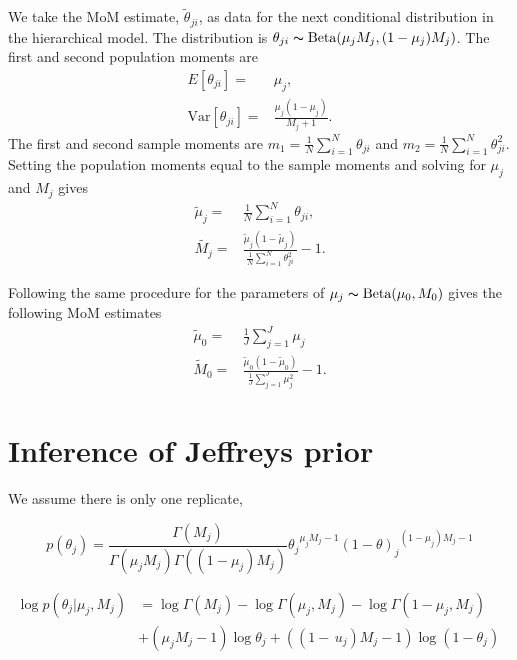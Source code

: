 \documentclass[11pt,reqno]{amsart}
\begin{document}
We take the MoM estimate, $\tilde{\theta}_{ji}$, as data for the next conditional distribution in the hierarchical model. The distribution is $\theta_{ji} \thicksim \text{Beta}(\mu_jM_j, (1-\mu_j)M_j)$. The first and second population moments are
\begin{eqnarray}
	E[\theta_{ji}] =& \mu_j,\\
	\text{Var}[\theta_{ji}] =& \frac{\mu_j(1-\mu_j)} { M_j + 1 }.
\end{eqnarray}
The first and second sample moments are $m_1 = \frac{1}{N}\sum_{i=1}^N \theta_{ji}$ and $m_2 = \frac{1}{N}\sum_{i=1}^N \theta_{ji}^2$. Setting the population moments equal to the sample moments and solving for $\mu_j$ and $M_j$ gives
\begin{eqnarray}
	\tilde{\mu}_j =& \frac{1}{N} \sum_{i=1}^N \theta_{ji}, \\
	\tilde{M_j} =& \frac{ \tilde{\mu}_j (1 - \tilde{\mu}_j ) } { \frac{1}{N} \sum_{i=1}^N \theta_{ji}^2 } -1.
\end{eqnarray}

Following the same procedure for the parameters of $\mu_j \thicksim \text{Beta}(\mu_0, M_0)$ gives the following MoM estimates
\begin{eqnarray}
	\tilde{\mu}_0 =& \frac{1}{J} \sum_{j=1}^J \mu_j \\
	\tilde{M}_0 =& \frac{ \tilde{\mu}_0 (1 - \tilde{\mu}_0 ) } {\frac{1}{J} \sum_{j=1}^J \mu_j^2 } -1.
\end{eqnarray}

\section{Inference of Jeffreys prior}\label{sec:appendix_mom}
We assume there is only one replicate,

\begin{equation}\label{eqn:Betapdf}
p\left({\theta }_{j} \right)= \frac{\Gamma \left({M}_{j} \right)}{\Gamma \left({\mu }_{j} {M}_{j}\right)\Gamma \left(( 1-{\mu }_{j}){M}_{j}\right)} {{\theta}_{j}}^{{\mu}_{j}{M}_{j}-1}{\left(1-\theta\right)_{j}}^{\left(1-{\mu}_{j}\right){M}_{j}-1}
\end{equation}

\begin{equation}\label{equ:JefferyInference1}
\begin{split}
\log p\left(\theta_{j}|\mu_{j},M_{j}\right)& =\log \Gamma \left(M_{j}\right)-\log \Gamma\left(\mu_{j},M_{j}\right)- \log \Gamma\left(1-\mu_{j},M_{j}\right)\\
& + (\mu_{j}M_{j}-1)\log\theta_{j} + ((1-\,u_{j})M_{j}-1)\log(1-\theta_{j})\
\end{split}
\end{equation}
\end{document}
